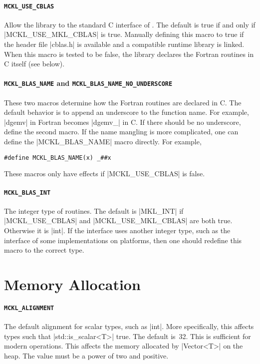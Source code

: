 \paragraph{\texttt{MCKL\_USE\_CBLAS}} Allow the library to the standard C
interface of \blas. The default is true if and only if |MCKL_USE_MKL_CBLAS| is
true. Manually defining this macro to true if the header file |cblas.h| is
available and a compatible runtime library is linked. When this macro is tested
to be false, the library declares the \blas Fortran routines in C itself (see
below).

\paragraph{\texttt{MCKL\_BLAS\_NAME} and
\texttt{MCKL\_BLAS\_NAME\_NO\_UNDERSCORE}} These two macros determine how the
\blas Fortran routines are declared in C. The default behavior is to append an
underscore to the function name. For example, |dgemv| in Fortran becomes
|dgemv_| in C. If there should be no underscore, define the second macro. If
the name mangling is more complicated, one can define the |MCKL_BLAS_NAME|
macro directly. For example,
\begin{verbatim}
#define MCKL_BLAS_NAME(x) _##x
\end{verbatim}
These macros only have effects if |MCKL_USE_CBLAS| is false.

\paragraph{\texttt{MCKL\_BLAS\_INT}} The integer type of \blas routines. The
default is |MKL_INT| if |MCKL_USE_CBLAS| and |MCKL_USE_MKL_CBLAS| are both
true. Otherwise it is |int|. If the \blas interface uses another integer type,
such as the \ilp interface of some implementations on \lp platforms, then one
should redefine this macro to the correct type.

\section{Memory Allocation}
\label{sec:Memory Allocation}

\paragraph{\texttt{MCKL\_ALIGNMENT}} The default alignment for scalar types,
such as |int|. More specifically, this affects types such that
|std::is_scalar<T>| true. The default is~32. This is sufficient for modern
\simd operations. This affects the memory allocated by |Vector<T>| on the heap.
The value must be a power of two and positive.

